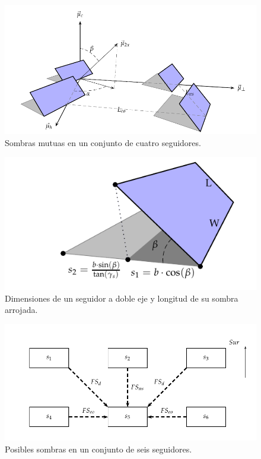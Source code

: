 \begin{figure}[htbp]
\centering
\includegraphics[height=0.2\textheight]{figuras/Sombras2X.pdf}
\caption{Sombras mutuas en un conjunto de cuatro seguidores. \label{fig:sombras-doble}}
\end{figure}
\begin{figure}[htbp]
\centering
\includegraphics[height=0.2\textheight]{figuras/DimensionesSeguidorSombra.pdf}
\caption{Dimensiones de un seguidor a doble eje y longitud de su sombra arrojada. \label{fig:dimensiones-sombras-doble}}
\end{figure}
\begin{figure}[htbp]
\centering
\includegraphics[height=0.2\textheight]{figuras/SixTrackerShadow.pdf}
\caption{Posibles sombras en un conjunto de seis seguidores. \label{fig:conjunto-seis-seguidores}}
\end{figure}


